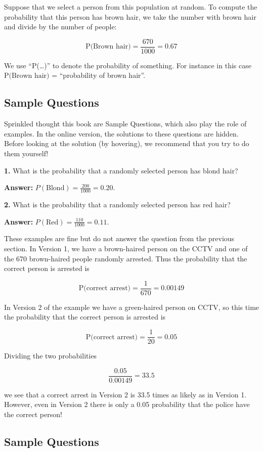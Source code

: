 \documentclass[
]{book}
\begin{document}
Suppose that we select a person from this population at random. To compute
the probability that this person has brown hair,
we take the number with brown hair and divide by the number of people:

\[\mbox{P(Brown hair)} = \frac{670}{1000} = 0.67\]

We use ``P(\ldots)'' to denote the probability of something. For instance in this case
\(\mbox{P(Brown hair)}\) = ``probability of brown hair''.

\hypertarget{sample-questions}{%
\subsection{Sample Questions}\label{sample-questions}}

Sprinkled thought this book are Sample Questions, which also play the role
of examples. In the online version, the
solutions to these questions are hidden. Before looking at the solution
(by hovering), we recommend that you try to do them yourself!

\textbf{1.} What is the probability that a randomly selected person has blond hair?

\textbf{Answer:} \(P(\text{Blond}) = \frac{200}{1000} = 0.20\).

\textbf{2.} What is the probability that a randomly selected person has red hair?

\textbf{Answer:} \(P(\text{Red}) = \frac{110}{1000} = 0.11\).

These examples are fine but do not answer the question from the previous section.
In Version 1, we have a brown-haired person on the CCTV and one of the
670 brown-haired people randomly arrested.
Thus the probability that the correct person is arrested is

\[\mbox{P(correct arrest)} = \frac{1}{670} = 0.00149\]

In Version 2 of the example we have a green-haired person on CCTV, so this
time the probability that the correct person is arrested is

\[\mbox{P(correct arrest)} = \frac{1}{20} = 0.05\]

Dividing the two probabilities

\[\frac{0.05}{0.00149} = 33.5\]

we see that a correct arrest in Version 2 is 33.5 times as likely as in Version 1.
However, even in Version 2 there is only a 0.05 probability that the police have
the correct person!

\hypertarget{sample-questions-1}{%
\subsection{Sample Questions}\label{sample-questions-1}}
\end{document}
